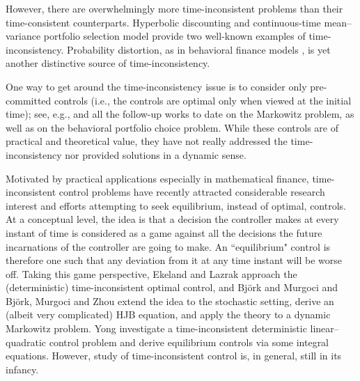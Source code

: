 \documentclass[final]{siamltex}
\begin{document}
However, there are overwhelmingly more time-inconsistent problems than their time-consistent counterparts. Hyperbolic discounting \cite{A, LP}
 and  continuous-time mean--variance portfolio selection model \cite{ZL,Basak} provide
two well-known  examples of time-inconsistency. Probability distortion, as in behavioral finance models \cite{JZ}, is yet another distinctive source of
time-inconsistency.

One way to get around  the time-inconsistency issue is to consider only  pre-committed controls (i.e., the controls are optimal only when viewed at the initial time);
see, e.g., \cite{ZL} and all the follow-up works to date on the Markowitz problem, as well as \cite{JZ} on the behavioral portfolio choice problem.
While these controls are of practical and theoretical value, they have not really addressed the time-inconsistency nor provided solutions in a dynamic sense.

Motivated by practical applications especially in mathematical finance, time-inconsistent control problems have recently  attracted considerable research interest
and efforts attempting to seek equilibrium, instead of optimal, controls. At a conceptual level, the idea is that a decision the controller makes at every  instant
of time is considered as a game against all the decisions the future incarnations of the controller are going to make. An ``equilibrium" control is therefore one
such that any deviation from it at any time instant will be worse off. Taking this game perspective, Ekeland and Lazrak \cite{EL} approach the (deterministic)
time-inconsistent optimal control, and Bj\"ork and Murgoci \cite{BM} and Bj\"ork, Murgoci and Zhou \cite{BMZ}  extend the idea to the stochastic setting, derive an
(albeit very complicated) HJB equation, and apply the theory to a dynamic Markowitz problem. Yong \cite{Y} investigate a time-inconsistent deterministic
linear--quadratic control problem and derive equilibrium controls via some integral equations.
However,  study of time-inconsistent control is, in general,  still in its infancy.
\end{document}
